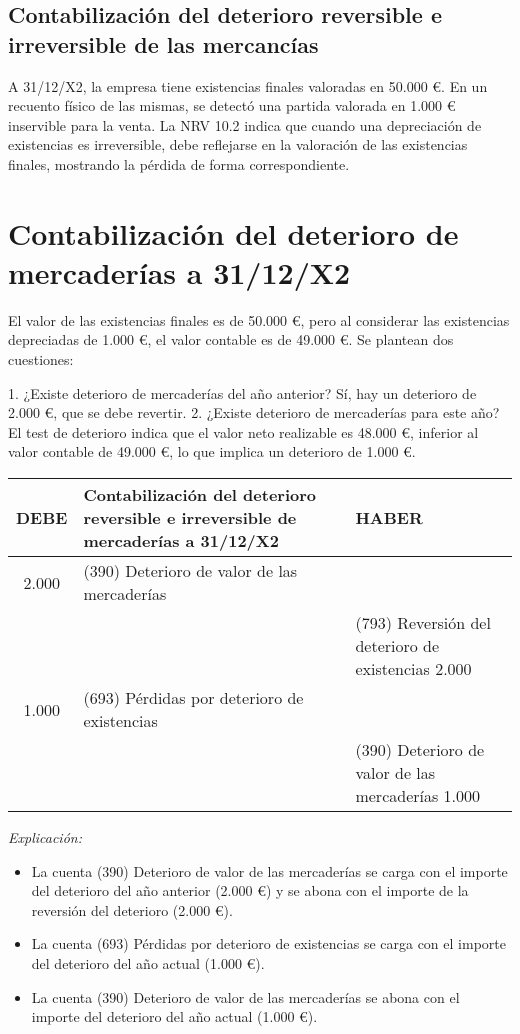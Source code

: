 \documentclass{article}
\begin{document}
\subsection*{Contabilización del deterioro reversible e irreversible de las mercancías}
A 31/12/X2, la empresa tiene existencias finales valoradas en 50.000 €. En un recuento físico de las mismas, se detectó una partida valorada en 1.000 € inservible para la venta. La NRV 10.2 indica que cuando una depreciación de existencias es irreversible, debe reflejarse en la valoración de las existencias finales, mostrando la pérdida de forma correspondiente.

\section*{Contabilización del deterioro de mercaderías a 31/12/X2}

El valor de las existencias finales es de 50.000 €, pero al considerar las existencias depreciadas de 1.000 €, el valor contable es de 49.000 €. Se plantean dos cuestiones:

1. ¿Existe deterioro de mercaderías del año anterior? Sí, hay un deterioro de 2.000 €, que se debe revertir.
2. ¿Existe deterioro de mercaderías para este año? El test de deterioro indica que el valor neto realizable es 48.000 €, inferior al valor contable de 49.000 €, lo que implica un deterioro de 1.000 €.

\begin{table}[H]
\centering
\begin{tabular}{|c|p{4cm}|p{3cm}|}
\hline
\textbf{DEBE} & Contabilización del deterioro reversible e irreversible de mercaderías a 31/12/X2 & \textbf{HABER} \\
\hline
2.000 & (390) Deterioro de valor de las mercaderías & \\
 & & (793) Reversión del deterioro de existencias 2.000 \\
1.000 & (693) Pérdidas por deterioro de existencias & \\
 & & (390) Deterioro de valor de las mercaderías 1.000 \\
\hline
\end{tabular}
\end{table}

\textit{Explicación:} 
\begin{itemize}
    \item La cuenta (390) Deterioro de valor de las mercaderías se carga con el importe del deterioro del año anterior (2.000 €) y se abona con el importe de la reversión del deterioro (2.000 €).
    \item La cuenta (693) Pérdidas por deterioro de existencias se carga con el importe del deterioro del año actual (1.000 €).
    \item La cuenta (390) Deterioro de valor de las mercaderías se abona con el importe del deterioro del año actual (1.000 €).
\end{itemize}
\end{document}
